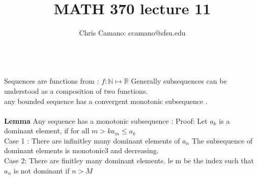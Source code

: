 \documentclass[11pt]{article}
\author{Chris Camano: ccamano@sfsu.edu}
\title{MATH 370  lecture 11 }
\date
\theoremstyle{definition}  %
\newcommand{\N}{\mathbb{N}}
\newcommand{\R}{\mathbb{R}}
\begin{document}
\maketitle

\\

Sequences are functions from : $f:\N\mapsto \R$ Generally subsequences can be understood as a composition of two functions.
\\
 any bounded sequence has a convergent monotonic  subsequence . \\\\
 \textbf{Lemma} Any sequence has a monotonic subsequence : Proof:
 Let $a_k$ is a dominant element, if for all $m>k a_m\leq a_k$  \\
 Case 1 : There are infinitley many dominant elements of $a_n$ The subsequence of dominant elements is monotonic3 and decreasing.
 \\
 Case 2: There are finitley many dominant elements. le m be the index such that $a_n$ is not dominant if $n>M$
\end{document}
